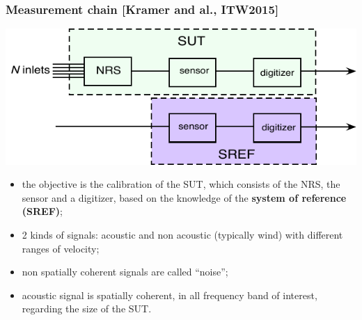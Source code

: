 \documentclass[handout,9pt]{beamer}
\begin{document}
\begin{frame}
\frametitle{Measurement chain [Kramer and al., ITW2015]}


\begin{center}
\includegraphics[scale=0.7]{fulltestbedIS26.pdf}
\end{center}



\begin{itemize}
\item
the objective is the calibration of the SUT, which consists of the NRS, the sensor and a digitizer, based on the knowledge of the 
  {\bf system of reference (SREF)};
\item
2 kinds of signals: acoustic and non acoustic (typically wind) with different ranges of velocity;
\item
non spatially coherent signals are called ``noise'';
\item
acoustic signal is spatially coherent, in all frequency band of interest, regarding the size of the SUT. 
\end{itemize}


\end{frame}
\end{document}
